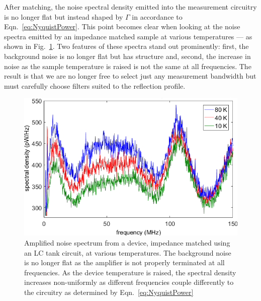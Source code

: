 After matching, the noise spectral density emitted into the measurement circuitry is no longer flat but instead shaped by $\Gamma$ in accordance to Eqn.~\ref{eq:NyquistPower}. This point becomes clear when looking at the noise spectra emitted by an impedance matched sample at various temperatures --- as shown in Fig.~\ref{fig:spectrum_matching}. Two features of these spectra stand out prominently: first, the background noise is no longer flat but has structure and, second, the increase in noise as the sample temperature is raised is not the same at all frequencies. The result is that we are no longer free to select just any measurement bandwidth but must carefully choose filters suited to the reflection profile.
\begin{figure}
\centering
\includegraphics[width = 120mm]{figures/Johnson_noise_thermometry/Matched_spectra.png}
\caption{Amplified noise spectrum from a device, impedance matched using an LC tank circuit, at various temperatures. The background noise is no longer flat as the amplifier is not properly terminated at all frequencies. As the device temperature is raised, the spectral density increases non-uniformly as different frequencies couple differently to the circuitry as determined by Eqn.~\ref{eq:NyquistPower}}
\label{fig:spectrum_matching}
\end{figure}

